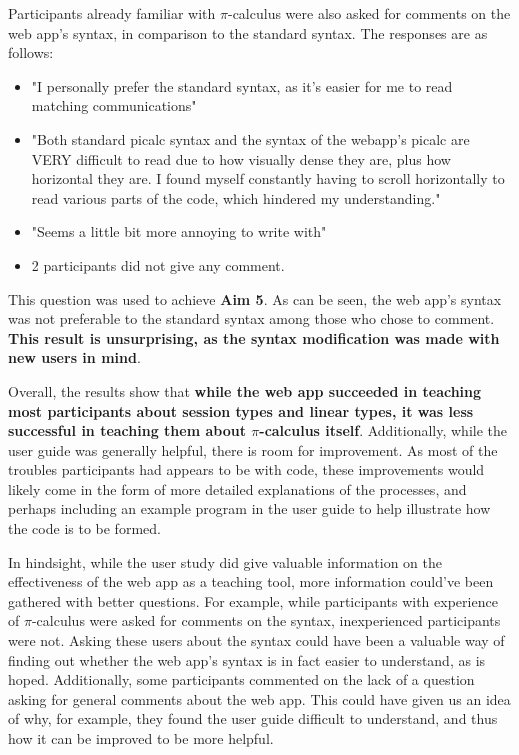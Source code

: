 \documentclass{l4proj}
\begin{document}
\quad Participants already familiar with $\pi$-calculus were also asked for comments on the web app's syntax, in comparison to the standard syntax. The responses are as follows:
\begin{itemize}
    \item "I personally prefer the standard syntax, as it's easier for me to read matching communications"
    \item "Both standard picalc syntax and the syntax of the webapp's picalc are VERY difficult to read due to how visually dense they are, plus how horizontal they are. I found myself constantly having to scroll horizontally to read various parts of the code, which hindered my understanding."
    \item "Seems a little bit more annoying to write with"
    \item 2 participants did not give any comment.
\end{itemize}
\quad This question was used to achieve \textbf{Aim 5}. As can be seen, the web app's syntax was not preferable to the standard syntax among those who chose to comment. \textbf{This result is unsurprising, as the syntax modification was made with new users in mind}.

\quad Overall, the results show that \textbf{while the web app succeeded in teaching most participants about session types and linear types, it was less successful in teaching them about $\pi$-calculus itself}. Additionally, while the user guide was generally helpful, there is room for improvement. As most of the troubles participants had appears to be with code, these improvements would likely come in the form of more detailed explanations of the processes, and perhaps including an example program in the user guide to help illustrate how the code is to be formed.

\quad In hindsight, while the user study did give valuable information on the effectiveness of the web app as a teaching tool, more information could've been gathered with better questions. For example, while participants with experience of $\pi$-calculus were asked for comments on the syntax, inexperienced participants were not. Asking these users about the syntax could have been a valuable way of finding out whether the web app's syntax is in fact easier to understand, as is hoped. Additionally, some participants commented on the lack of a question asking for general comments about the web app. This could have given us an idea of why, for example, they found the user guide difficult to understand, and thus how it can be improved to be more helpful.
\end{document}
